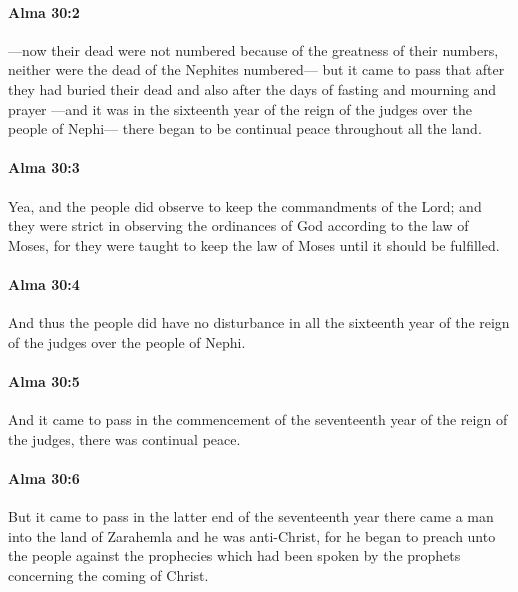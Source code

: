		\paragraph{Alma 30:2} %
			\label{ALMA-30-2}

			---now their dead were not numbered because of the greatness of their numbers,
			neither were the dead of the Nephites numbered---
			but it came to pass that after they had buried their dead
			and also after the days of fasting and mourning and prayer
			---and it was in the sixteenth year of the reign of the judges over the people of Nephi---
			there began to be continual peace throughout all the land.

		\paragraph{Alma 30:3} %
			\label{ALMA-30-3}

			Yea, and the people did observe to keep the commandments of the Lord;
			and they were strict in observing the ordinances of God
			according to the law of Moses,
			for they were taught to keep the law of Moses until it should be fulfilled.

		\paragraph{Alma 30:4} %
			\label{ALMA-30-4}

			And thus the people did have no disturbance
			in all the sixteenth year of the reign of the judges over the people of Nephi.

		\paragraph{Alma 30:5} %
			\label{ALMA-30-5}

			And it came to pass in the commencement
			of the seventeenth year of the reign of the judges,
			there was continual peace.

		\paragraph{Alma 30:6} %
			\label{ALMA-30-6}

			But it came to pass in the latter end of the seventeenth year
			there came a man into the land of Zarahemla and he was anti-Christ,
			for he began to preach unto the people against the prophecies
			which had been spoken by the prophets concerning the coming of Christ.

